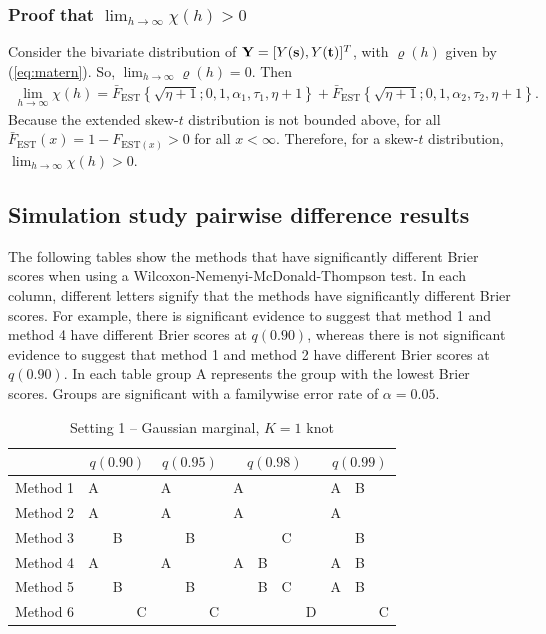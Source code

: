 \documentclass[11pt]{article}
\begin{document}
\subsubsection*{Proof that $\lim_{h \rightarrow \infty} \chi(h) > 0$}
Consider the bivariate distribution of $\mbox{\bf Y} = [Y(\mbox{\bf s}), Y(\mbox{\bf t})]^T$, with $\varrho(h)$ given by (\ref{eq:matern}).
So, $\lim_{h \rightarrow \infty} \varrho(h) = 0$.
Then
\begin{align}
  \lim_{h \rightarrow \infty} \chi(h) = \bar{F}_{\text{EST}}\left\{ \sqrt{\eta + 1}; 0, 1, \alpha_1, \tau_1, \eta + 1 \right\} + \bar{F}_{\text{EST}}\left\{ \sqrt{\eta + 1}; 0, 1, \alpha_2, \tau_2, \eta + 1 \right\}.
\end{align}
Because the extended skew-$t$ distribution is not bounded above, for all $\bar{F}_{\text{EST}}(x) = 1 - F_{\text{EST} (x)} > 0$ for all $x < \infty$.
Therefore, for a skew-$t$ distribution, $\lim_{h \rightarrow \infty} \chi(h) > 0$.

\subsection{Simulation study pairwise difference results} \label{a:pdiffs}
The following tables show the methods that have significantly different Brier scores when using a Wilcoxon-Nemenyi-McDonald-Thompson test.
In each column, different letters signify that the methods have significantly different Brier scores.
For example, there is significant evidence to suggest that method 1 and method 4 have different Brier scores at $q(0.90)$, whereas there is not significant evidence to suggest that method 1 and method 2 have different Brier scores at $q(0.90)$.
In each table group A represents the group with the lowest Brier scores.
Groups are significant with a familywise error rate of $\alpha = 0.05$.

\begin{table}[htbp]
  \centering
  \caption{Setting 1 -- Gaussian marginal, $K = 1$ knot}
  \label{tbl:gaussim}
  \begin{tabular}{|l|ccc|ccc|cccc|ccc|}
    \cline{2-14}
    \multicolumn{1}{c}{} & \multicolumn{3}{|c}{$q(0.90)$} & \multicolumn{3}{|c}{$q(0.95)$} & \multicolumn{4}{|c}{$q(0.98)$} & \multicolumn{3}{|c|}{$q(0.99)$} \\
    \hline
    Method 1 & A &   &   & A &   &   & A &   &   &   & A & B &   \\
    \hline
    Method 2 & A &   &   & A &   &   & A &   &   &   & A &   &   \\
    \hline
    Method 3 &   & B &   &   & B &   &   &   & C &   &   & B &   \\
    \hline
    Method 4 & A &   &   & A &   &   & A & B &   &   & A & B &   \\
    \hline
    Method 5 &   & B &   &   & B &   &   & B & C &   & A & B &   \\
    \hline
    Method 6 &   &   & C &   &   & C &   &   &   & D &   &   & C \\
    \hline
  \end{tabular}
\end{table}
\end{document}
